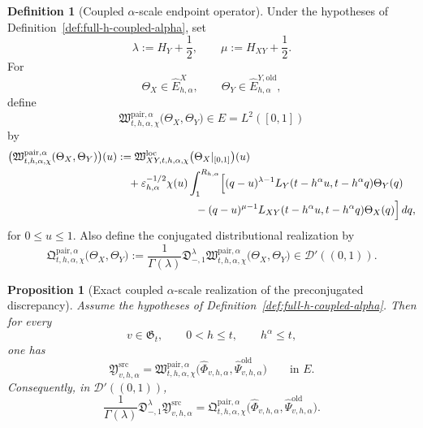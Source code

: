 \documentclass[11pt,a4paper]{amsart}
\theoremstyle{plain}
\newtheorem{proposition}[theorem]{Proposition}
\theoremstyle{definition}
\newtheorem{definition}[theorem]{Definition}
\theoremstyle{remark}
\begin{document}
\begin{definition}[Coupled \(\alpha\)-scale endpoint operator]
\label{def:full-h-coupled-alpha-op}
Under the hypotheses of Definition~\ref{def:full-h-coupled-alpha}, set
\[
\lambda:=H_Y+\frac12,
\qquad
\mu:=H_{XY}+\frac12.
\]
For
\[
\Theta_X\in \widehat E_{h,\alpha}^{X},
\qquad
\Theta_Y\in \widehat E_{h,\alpha}^{Y,\mathrm{old}},
\]
define
\[
\mathfrak W_{t,h,\alpha,\chi}^{\mathrm{pair},\alpha}
\bigl(
\Theta_X,\Theta_Y
\bigr)
\in E=L^2([0,1])
\]
by
\begin{align}
\bigl(
\mathfrak W_{t,h,\alpha,\chi}^{\mathrm{pair},\alpha}
(\Theta_X,\Theta_Y)
\bigr)(u)
&:=
\mathfrak W_{XY,t,h,\alpha,\chi}^{\mathrm{loc}}
\bigl(
\Theta_X|_{[0,1]}
\bigr)(u)
\notag\\
&\quad+
\varepsilon_{h,\alpha}^{-1/2}\chi(u)
\int_1^{R_{h,\alpha}}
\Bigl[
(q-u)^{\lambda-1}
L_Y(t-h^\alpha u,t-h^\alpha q)\Theta_Y(q)
\notag\\
&\hspace{7.2em}-
(q-u)^{\mu-1}
L_{XY}(t-h^\alpha u,t-h^\alpha q)\Theta_X(q)
\Bigr]\,dq,
\label{eq:full-h-coupled-alpha-op}
\end{align}
for \(0\le u\le1\). Also define the conjugated distributional realization by
\begin{equation}\label{eq:full-h-coupled-alpha-op-conj}
\mathfrak Q_{t,h,\alpha,\chi}^{\mathrm{pair},\alpha}
\bigl(
\Theta_X,\Theta_Y
\bigr)
:=
\frac{1}{\Gamma(\lambda)}
\mathfrak D_{-,1}^{\lambda}
\mathfrak W_{t,h,\alpha,\chi}^{\mathrm{pair},\alpha}
\bigl(
\Theta_X,\Theta_Y
\bigr)
\in \mathcal D'((0,1)).
\end{equation}
\end{definition}

\begin{proposition}[Exact coupled \(\alpha\)-scale realization of the preconjugated discrepancy]
\label{prop:full-h-coupled-alpha}
Assume the hypotheses of Definition~\ref{def:full-h-coupled-alpha}. Then for every
\[
v\in\mathfrak G_t,
\qquad
0<h\le t,
\qquad
h^\alpha\le t,
\]
one has
\begin{equation}\label{eq:full-h-coupled-alpha-id}
\mathfrak Y_{v,h,\alpha}^{\mathrm{src}}
=
\mathfrak W_{t,h,\alpha,\chi}^{\mathrm{pair},\alpha}
\bigl(
\widehat\Phi_{v,h,\alpha},
\widehat\Psi_{v,h,\alpha}^{\mathrm{old}}
\bigr)
\qquad\text{in }E.
\end{equation}
Consequently, in \(\mathcal D'((0,1))\),
\begin{equation}\label{eq:full-h-coupled-alpha-conj}
\frac{1}{\Gamma(\lambda)}
\mathfrak D_{-,1}^{\lambda}
\mathfrak Y_{v,h,\alpha}^{\mathrm{src}}
=
\mathfrak Q_{t,h,\alpha,\chi}^{\mathrm{pair},\alpha}
\bigl(
\widehat\Phi_{v,h,\alpha},
\widehat\Psi_{v,h,\alpha}^{\mathrm{old}}
\bigr).
\end{equation}
\end{proposition}
\end{document}
